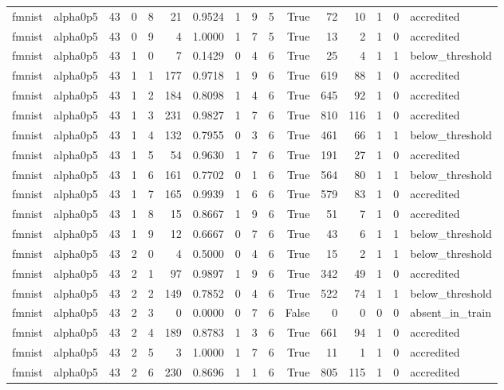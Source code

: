 \begin{tabular}{llrrrrrrrrrrrrrl}
fmnist & alpha0p5 & 43 & 0 & 8 & 21 & 0.9524 & 1 & 9 & 5 & True & 72 & 10 & 1 & 0 & accredited \\
fmnist & alpha0p5 & 43 & 0 & 9 & 4 & 1.0000 & 1 & 7 & 5 & True & 13 & 2 & 1 & 0 & accredited \\
fmnist & alpha0p5 & 43 & 1 & 0 & 7 & 0.1429 & 0 & 4 & 6 & True & 25 & 4 & 1 & 1 & below\_threshold \\
fmnist & alpha0p5 & 43 & 1 & 1 & 177 & 0.9718 & 1 & 9 & 6 & True & 619 & 88 & 1 & 0 & accredited \\
fmnist & alpha0p5 & 43 & 1 & 2 & 184 & 0.8098 & 1 & 4 & 6 & True & 645 & 92 & 1 & 0 & accredited \\
fmnist & alpha0p5 & 43 & 1 & 3 & 231 & 0.9827 & 1 & 7 & 6 & True & 810 & 116 & 1 & 0 & accredited \\
fmnist & alpha0p5 & 43 & 1 & 4 & 132 & 0.7955 & 0 & 3 & 6 & True & 461 & 66 & 1 & 1 & below\_threshold \\
fmnist & alpha0p5 & 43 & 1 & 5 & 54 & 0.9630 & 1 & 7 & 6 & True & 191 & 27 & 1 & 0 & accredited \\
fmnist & alpha0p5 & 43 & 1 & 6 & 161 & 0.7702 & 0 & 1 & 6 & True & 564 & 80 & 1 & 1 & below\_threshold \\
fmnist & alpha0p5 & 43 & 1 & 7 & 165 & 0.9939 & 1 & 6 & 6 & True & 579 & 83 & 1 & 0 & accredited \\
fmnist & alpha0p5 & 43 & 1 & 8 & 15 & 0.8667 & 1 & 9 & 6 & True & 51 & 7 & 1 & 0 & accredited \\
fmnist & alpha0p5 & 43 & 1 & 9 & 12 & 0.6667 & 0 & 7 & 6 & True & 43 & 6 & 1 & 1 & below\_threshold \\
fmnist & alpha0p5 & 43 & 2 & 0 & 4 & 0.5000 & 0 & 4 & 6 & True & 15 & 2 & 1 & 1 & below\_threshold \\
fmnist & alpha0p5 & 43 & 2 & 1 & 97 & 0.9897 & 1 & 9 & 6 & True & 342 & 49 & 1 & 0 & accredited \\
fmnist & alpha0p5 & 43 & 2 & 2 & 149 & 0.7852 & 0 & 4 & 6 & True & 522 & 74 & 1 & 1 & below\_threshold \\
fmnist & alpha0p5 & 43 & 2 & 3 & 0 & 0.0000 & 0 & 7 & 6 & False & 0 & 0 & 0 & 0 & absent\_in\_train \\
fmnist & alpha0p5 & 43 & 2 & 4 & 189 & 0.8783 & 1 & 3 & 6 & True & 661 & 94 & 1 & 0 & accredited \\
fmnist & alpha0p5 & 43 & 2 & 5 & 3 & 1.0000 & 1 & 7 & 6 & True & 11 & 1 & 1 & 0 & accredited \\
fmnist & alpha0p5 & 43 & 2 & 6 & 230 & 0.8696 & 1 & 1 & 6 & True & 805 & 115 & 1 & 0 & accredited \\

\end{tabular}
